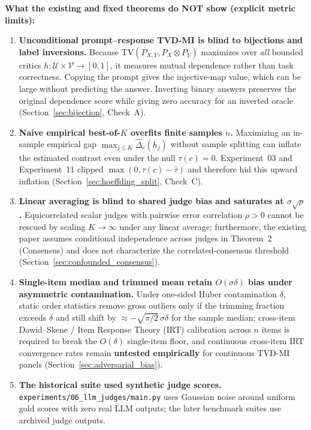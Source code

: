 \documentclass[11pt]{article}
\newcommand{\TV}{\mathrm{TV}}
\newcommand{\cU}{\mathcal{U}}
\newcommand{\cV}{\mathcal{V}}
\begin{document}
\textbf{What the existing and fixed theorems do NOT show (explicit metric limits):}
\begin{enumerate}[leftmargin=*,itemsep=2pt]
\item \textbf{Unconditional prompt--response TVD-MI is blind to bijections and label inversions.} Because $\TV(P_{X,Y}, P_X \otimes P_Y)$ maximizes over \emph{all} bounded critics $h:\cU\times\cV\to[0,1]$, it measures mutual dependence rather than task correctness. Copying the prompt gives the injective-map value, which can be large without predicting the answer. Inverting binary answers preserves the original dependence score while giving zero accuracy for an inverted oracle (Section~\ref{sec:bijection}, Check~A).
\item \textbf{Naive empirical best-of-$K$ overfits finite samples $n$.} Maximizing an in-sample empirical gap $\max_{j \le K} \widehat{\Delta}_c(h_j)$ without sample splitting can inflate the estimated contrast even under the null $\tau(c)=0$. Experiment~03 and Experiment~11 clipped $\max(0, \tau(c) - \hat{\tau})$ and therefore hid this upward inflation (Section~\ref{sec:hoeffding_split}, Check~C).
\item \textbf{Linear averaging is blind to shared judge bias and saturates at $\sigma\sqrt{\rho}$.} Equicorrelated scalar judges with pairwise error correlation $\rho > 0$ cannot be rescued by scaling $K \to \infty$ under any linear average; furthermore, the existing paper assumes conditional independence across judges in Theorem~2 (Consensus) and does not characterize the correlated-consensus threshold (Section~\ref{sec:confounded_consensus}).
\item \textbf{Single-item median and trimmed mean retain $O(\sigma\delta)$ bias under asymmetric contamination.} Under one-sided Huber contamination $\delta$, static order statistics remove gross outliers only if the trimming fraction exceeds $\delta$ and still shift by $\approx -\sqrt{\pi/2}\,\sigma\delta$ for the sample median; cross-item Dawid--Skene / Item Response Theory (IRT) calibration across $n$ items is required to break the $O(\delta)$ single-item floor, and continuous cross-item IRT convergence rates remain \textbf{untested empirically} for continuous TVD-MI panels (Section~\ref{sec:adversarial_bias}).
\item \textbf{The historical suite used synthetic judge scores.} \texttt{experiments/06\_llm\_judges/main.py} uses Gaussian noise around uniform gold scores with zero real LLM outputs; the later benchmark suites use archived judge outputs.
\end{enumerate}
\end{document}
